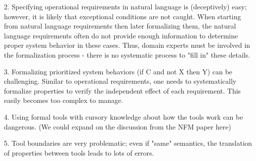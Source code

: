 2. Specifying operational requirements in natural language is (deceptively) easy; however, it is likely that exceptional conditions are not caught.  When starting from natural language requirements then later formalizing them, the natural language requirements often do not provide enough information to determine proper system behavior in these cases.  Thus, domain experts must be involved in the formalization process - there is no systematic process to "fill in" these details.

3. Formalizing prioritized system behaviors (if C and not X then Y) can be challenging. Similar to operational requirements, one needs to systematically formalize properties to verify the independent effect of each requirement. This easily becomes too complex to manage.

4. Using formal tools with cursory knowledge about how the tools work can be dangerous.
(We could expand on the discussion from the NFM paper here)

5. Tool boundaries are very problematic; even if "same" semantics, the translation of properties between tools
  leads to lots of errors.

\fi 